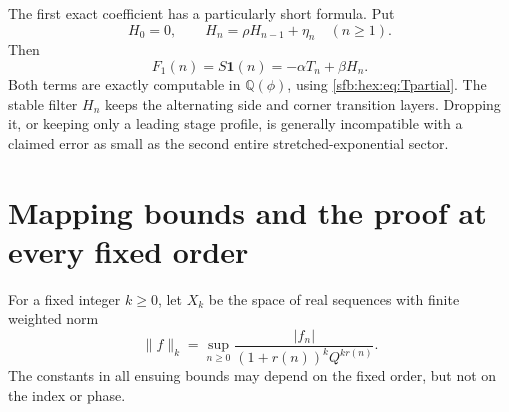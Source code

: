 \documentclass[11pt]{article}
\theoremstyle{remark}\newtheorem{remark}[theorem]{Remark}
\newcommand{\one}{\boldsymbol 1}
\newcommand{\Q}{\mathbb Q}
\begin{document}
The first exact coefficient has a particularly short formula. Put
\begin{equation}\label{sfb:hex:eq:H}
 H_0=0,\qquad H_n=\rho H_{n-1}+\eta_n\quad(n\ge1).
\end{equation}
Then
\begin{equation}\label{sfb:hex:eq:F1}
 F_1(n)=S\one(n)=-\alpha T_n+\beta H_n.
\end{equation}
Both terms are exactly computable in $\Q(\phi)$, using \eqref{sfb:hex:eq:Tpartial}. The stable filter $H_n$ keeps the alternating side and corner transition layers. Dropping it, or keeping only a leading stage profile, is generally incompatible with a claimed error as small as the second entire stretched-exponential sector.

\section{Mapping bounds and the proof at every fixed order}\label{sfb:hex:sec:mapping}
For a fixed integer $k\ge0$, let $X_k$ be the space of real sequences with finite weighted norm
\begin{equation}\label{sfb:hex:eq:X}
 \|f\|_k=\sup_{n\ge0}
 \frac{|f_n|}{(1+r(n))^kQ^{kr(n)}}.
\end{equation}
The constants in all ensuing bounds may depend on the fixed order, but not on the index or phase.
\end{document}
